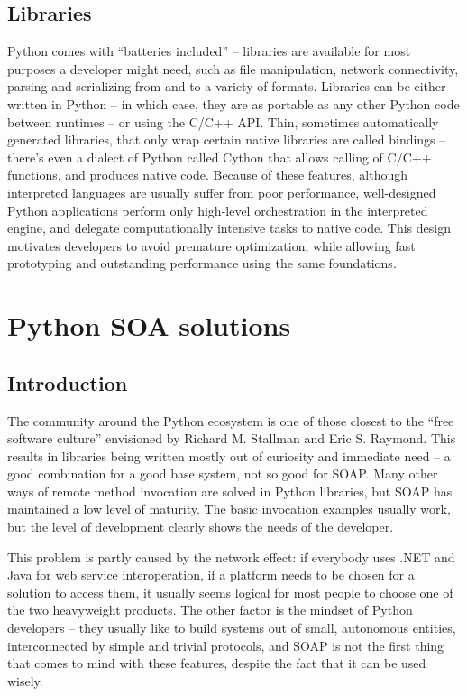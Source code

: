 \subsection{Libraries}

Python comes with ``batteries included'' -- libraries are available for most purposes a developer might need, such as file manipulation, network connectivity, parsing and serializing from and to a variety of formats. Libraries can be either written in Python -- in which case, they are as portable as any other Python code between runtimes -- or using the C/C++ API. Thin, sometimes automatically generated libraries, that only wrap certain native libraries are called bindings -- there's even a dialect of Python called Cython that allows calling of C/C++ functions, and produces native code. Because of these features, although interpreted languages are usually suffer from poor performance, well-designed Python applications perform only high-level orchestration in the interpreted engine, and delegate computationally intensive tasks to native code. This design motivates developers to avoid premature optimization, while allowing fast prototyping and outstanding performance using the same foundations.

\section{Python SOA solutions}

\subsection{Introduction}

The community around the Python ecosystem is one of those closest to the ``free software culture'' envisioned by Richard M. Stallman and Eric S. Raymond. This results in libraries being written mostly out of curiosity and immediate need -- a good combination for a good base system, not so good for SOAP. Many other ways of remote method invocation are solved in Python libraries, but SOAP has maintained a low level of maturity. The basic invocation examples usually work, but the level of development clearly shows the needs of the developer.

This problem is partly caused by the network effect: if everybody uses .NET and Java for web service interoperation, if a platform needs to be chosen for a solution to access them, it usually seems logical for most people to choose one of the two heavyweight products. The other factor is the mindset of Python developers -- they usually like to build systems out of small, autonomous entities, interconnected by simple and trivial protocols, and SOAP is not the first thing that comes to mind with these features, despite the fact that it can be used wisely.

